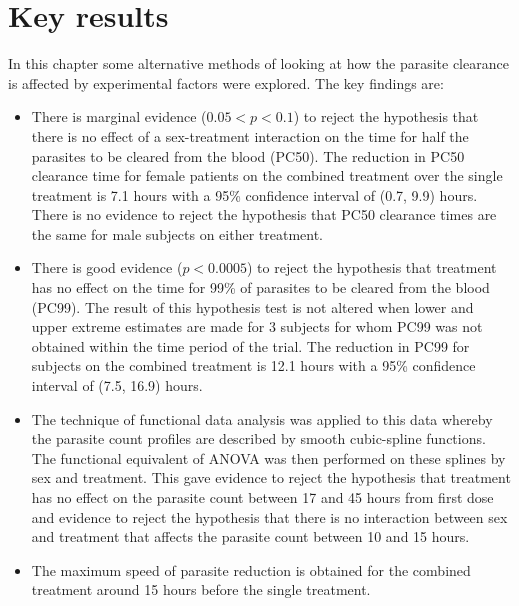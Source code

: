 \section{Key results}
In this chapter some alternative methods of looking at how the parasite clearance is affected by experimental factors were explored. The key findings are:
\begin{itemize}
\item There is marginal evidence ($0.05<p<0.1$) to reject the hypothesis that there is no effect of a sex-treatment interaction on the time for half the parasites to be cleared from the blood (PC50). The reduction in PC50 clearance time for female patients on the combined treatment over the single treatment is 7.1 hours with a 95\% confidence interval of (0.7, 9.9) hours. There is no evidence to reject the hypothesis that PC50 clearance times are the same for male subjects on either treatment.
\item There is good evidence ($p<0.0005$) to reject the hypothesis that treatment has no effect on the time for 99\% of parasites to be cleared from the blood (PC99). The result of this hypothesis test is not altered when lower and upper extreme estimates are made for 3 subjects for whom PC99 was not obtained within the time period of the trial. The reduction in PC99 for subjects on the combined treatment is 12.1 hours with a 95\% confidence interval of (7.5, 16.9) hours.
\item The technique of functional data analysis was applied to this data whereby the parasite count profiles are described by smooth cubic-spline functions. The functional equivalent of ANOVA was then performed on these splines by sex and treatment. This gave evidence to reject the hypothesis that treatment has no effect on the parasite count between 17 and 45 hours from first dose and evidence to reject the hypothesis that there is no interaction between sex and treatment that affects the parasite count between 10 and 15 hours.
\item The maximum speed of parasite reduction is obtained for the combined treatment around 15 hours before the single treatment.
\end{itemize}